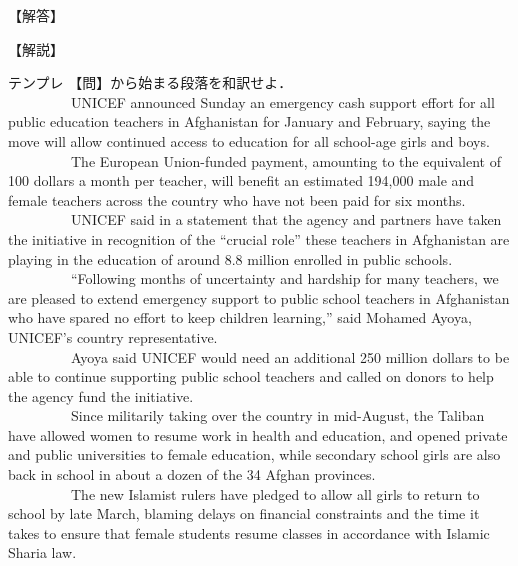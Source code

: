 \documentclass[b4paper,fleqn,dvipdfmx]{jsarticle}
\begin{document}
\begin{flushleft}
【解答】
\end{flushleft}



\begin{flushleft}
【解説】
\end{flushleft}

\newpage

\begin{itembox}[l]{テンプレ}
【問】から始まる段落を和訳せよ．\\
\ \ \ \ \ \ \ \ \ UNICEF announced Sunday an emergency cash support effort for all public education teachers in Afghanistan for January and February, saying the move will allow continued access to education for all school-age girls and boys.\\
\ \ \ \ \ \ \ \ \ The European Union-funded payment, amounting to the equivalent of 100 dollars a month per teacher, will benefit an estimated 194,000 male and female teachers across the country who have not been paid for six months.\\
\ \ \ \ \ \ \ \ \ UNICEF said in a statement that the agency and partners have taken the initiative in recognition of the “crucial role” these teachers in Afghanistan are playing in the education of around 8.8 million enrolled in public schools.\\
\ \ \ \ \ \ \ \ \ “Following months of uncertainty and hardship for many teachers, we are pleased to extend emergency support to public school teachers in Afghanistan who have spared no effort to keep children learning,” said Mohamed Ayoya, UNICEF’s country representative.\\
\ \ \ \ \ \ \ \ \ Ayoya said UNICEF would need an additional 250 million dollars to be able to continue supporting public school teachers and called on donors to help the agency fund the initiative.\\
\ \ \ \ \ \ \ \ \ Since militarily taking over the country in mid-August, the Taliban have allowed women to resume work in health and education, and opened private and public universities to female education, while secondary school girls are also back in school in about a dozen of the 34 Afghan provinces.\\
\ \ \ \ \ \ \ \ \ The new Islamist rulers have pledged to allow all girls to return to school by late March, blaming delays on financial constraints and the time it takes to ensure that female students resume classes in accordance with Islamic Sharia law.\\

\end{itembox}
\end{document}
